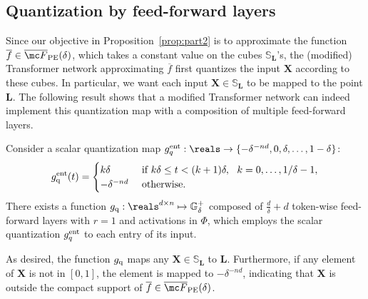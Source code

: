\documentclass{article} %
\def\mA{{\bm{A}}}
\def\mL{{\bm{L}}}
\def\mX{{\bm{X}}}
\def\sG{{\mathbb{G}}}
\def\sS{{\mathbb{S}}}
\renewcommand{\indic}[1]{\mathbbm{1}\left\{#1\right\}}
\begin{document}
\vspace*{-3pt}
\subsection{Quantization by feed-forward layers}
\vspace*{-3pt}
\label{sec:ff-quantize}
Since our objective in Proposition~\ref{prop:part2} is to approximate the function $\overline{f} \in \overline {\mc F}_{\rm PE}(\delta)$,
which takes a constant value on the cubes $\sS_{\mL}$'s, the (modified) Transformer network approximating $\overline{f}$ first quantizes the input $\mX$ according to these cubes. In particular, we want each input $\mX \in \sS_{\mL}$ to be mapped to the point $\mL$. The following result shows that a modified Transformer network can indeed implement this quantization map with a composition of multiple feed-forward layers. 

\begin{lemma}
\label{lemma:quantize}
Consider a scalar quantization map $g^{\rm ent}_{q} : \reals \to  \{ -\delta^{-nd}, 0, \delta, \dots, 1-\delta \}$:
\begin{equation*}
    g_{\rm q}^{\rm ent} (t) = 
    \begin{cases}
    k\delta & \text{ if } k\delta \leq t < (k+1)\delta, ~~k = 0, \dots, 1/\delta-1,\\
    -\delta^{-nd} & \text{ otherwise. }
    \end{cases}
\end{equation*}
There exists a function $g_{\rm q}: \reals^{d \times n} \mapsto \sG^{+}_{\delta}$ composed of $\frac{d}{\delta} + d$ token-wise feed-forward layers with $r=1$ and activations in $\Phi$, which employs the scalar quantization $g^{\rm ent}_{q}$ to each entry of its input.
\end{lemma}

As desired, the function $g_{\rm q}$ maps any $\mX \in \sS_\mL$ to $\mL$. Furthermore, if any element of $\mX$ is not in $[0, 1]$, the element is mapped to $-\delta^{-nd}$, indicating that $\mX$ is outside the compact support of $\overline{f} \in \overline{\mc F}_{\rm PE}(\delta)$.

\vspace*{-3pt}
\end{document}
